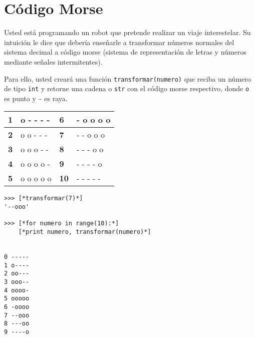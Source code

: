 \section{Código Morse}

Usted está programando un robot que pretende realizar un viaje interestelar. Su intuición le dice que debería enseñarle a transformar números normales del sistema decimal a código morse (sistema de representación de letras y números mediante señales intermitentes).

Para ello, usted creará una función \texttt{transformar(numero)} que reciba un número de tipo \texttt{int} y retorne una cadena o \texttt{str} con el código morse respectivo, donde \texttt{o} es punto y \texttt{-} es raya.

\begin{table}[h]
\centering
\begin{tabular}{|l|l|l|l|}
\hline
\textbf{1} & o - - - -  & \textbf{6}  & - o o o o \\ \hline
\textbf{2} & o o - - -  & \textbf{7}  & - - o o o \\ \hline
\textbf{3} & o o o - -  & \textbf{8}  & - - - o o \\ \hline
\textbf{4} & o o o o -  & \textbf{9}  & - - - - o \\ \hline
\textbf{5} & o o o o o  & \textbf{10} & - - - - - \\ \hline
\end{tabular}
\end{table}

\begin{lstlisting}[style=consola]
>>> [*transformar(7)*]
'--ooo'

>>> [*for numero in range(10):*]
	[*print numero, transformar(numero)*]

	
0 -----
1 o----
2 oo---
3 ooo--
4 oooo-
5 ooooo
6 -oooo
7 --ooo
8 ---oo
9 ----o
\end{lstlisting}